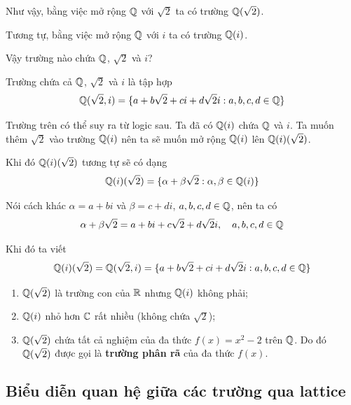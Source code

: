 Như vậy, bằng việc mở rộng $\mathbb{Q}$ với $\sqrt{2}$ ta có trường $\mathbb{Q}(\sqrt{2})$.

Tương tự, bằng việc mở rộng $\mathbb{Q}$ với $i$ ta có trường $\mathbb{Q}(i)$.

Vậy trường nào chứa $\mathbb{Q}$, $\sqrt{2}$ và $i$?

\begin{example}
    Trường chứa cả $\mathbb{Q}$, $\sqrt{2}$ và $i$ là tập hợp
    \begin{equation*}
        \mathbb{Q}(\sqrt{2}, i) = \{ a + b\sqrt{2} + c i + d \sqrt{2} i : a, b, c, d \in \mathbb{Q} \}
    \end{equation*}
\end{example}

Trường trên có thể suy ra từ logic sau. Ta đã có $\mathbb{Q}(i)$ chứa $\mathbb{Q}$ và $i$. Ta muốn thêm $\sqrt{2}$ vào trường $\mathbb{Q}(i)$ nên ta sẽ muốn mở rộng $\mathbb{Q}(i)$ lên $\mathbb{Q}(i)(\sqrt{2})$.

Khi đó $\mathbb{Q}(i)(\sqrt{2})$ tương tự sẽ có dạng
\begin{equation*}
    \mathbb{Q}(i)(\sqrt{2}) = \{ \alpha + \beta \sqrt{2} : \alpha, \beta \in \mathbb{Q}(i) \}
\end{equation*}

Nói cách khác $\alpha = a + b i$ và $\beta = c + d i$, $a, b, c, d \in \mathbb{Q}$, nên ta có
\begin{equation*}
    \alpha + \beta \sqrt{2} = a + b i + c \sqrt{2} + d \sqrt{2} i, \quad a, b, c, d \in \mathbb{Q}
\end{equation*}

Khi đó ta viết
\begin{equation*}
    \mathbb{Q}(i)(\sqrt{2}) = \mathbb{Q}(\sqrt{2}, i) = \{ a + b\sqrt{2} + c i + d \sqrt{2} i : a, b, c, d \in \mathbb{Q} \}
\end{equation*}

\begin{remark}
    \begin{enumerate}
        \item $\mathbb{Q}(\sqrt{2})$ là trường con của $\mathbb{R}$ nhưng $\mathbb{Q}(i)$ không phải;
        \item $\mathbb{Q}(i)$ nhỏ hơn $\mathbb{C}$ rất nhiều (không chứa $\sqrt{2}$);
        \item $\mathbb{Q}(\sqrt{2})$ chứa tất cả nghiệm của đa thức $f(x) = x^2 - 2$ trên $\mathbb{Q}$. Do đó $\mathbb{Q}(\sqrt{2})$ được gọi là \textbf{trường phân rã} của đa thức $f(x)$.
    \end{enumerate}
\end{remark}

\subsection*{Biểu diễn quan hệ giữa các trường qua lattice}

